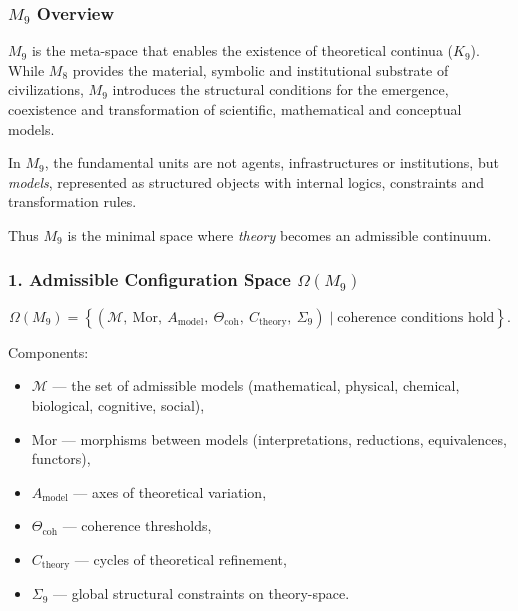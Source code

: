 

\subsubsection{\texorpdfstring{$M_9$}{M_9} Overview}
\label{sec:m9-overview}

$M_9$ is the meta-space that enables the existence of
theoretical continua ($K_9$).
While $M_8$ provides the material, symbolic and institutional
substrate of civilizations, $M_9$ introduces the structural conditions
for the emergence, coexistence and transformation of
scientific, mathematical and conceptual models.

In $M_9$, the fundamental units are not agents, infrastructures or
institutions, but \emph{models}, represented as structured objects
with internal logics, constraints and transformation rules.

Thus $M_9$ is the minimal space where \emph{theory} becomes an admissible continuum.

\subsubsection*{1. Admissible Configuration Space \texorpdfstring{$\Omega(M_9)$}{\Omega(M_9)}}

\[
\Omega(M_9)=
\left\{
(\mathcal{M},\ \mathrm{Mor},\ A_{\mathrm{model}},\
\Theta_{\mathrm{coh}},\ C_{\mathrm{theory}},\ \Sigma_9)
\mid \text{coherence conditions hold}
\right\}.
\]

Components:

\begin{itemize}
    \item $\mathcal{M}$ — the set of admissible models
        (mathematical, physical, chemical, biological, cognitive, social),
    \item $\mathrm{Mor}$ — morphisms between models
        (interpretations, reductions, equivalences, functors),
    \item $A_{\mathrm{model}}$ — axes of theoretical variation,
    \item $\Theta_{\mathrm{coh}}$ — coherence thresholds,
    \item $C_{\mathrm{theory}}$ — cycles of theoretical refinement,
    \item $\Sigma_9$ — global structural constraints on theory-space.
\end{itemize}

